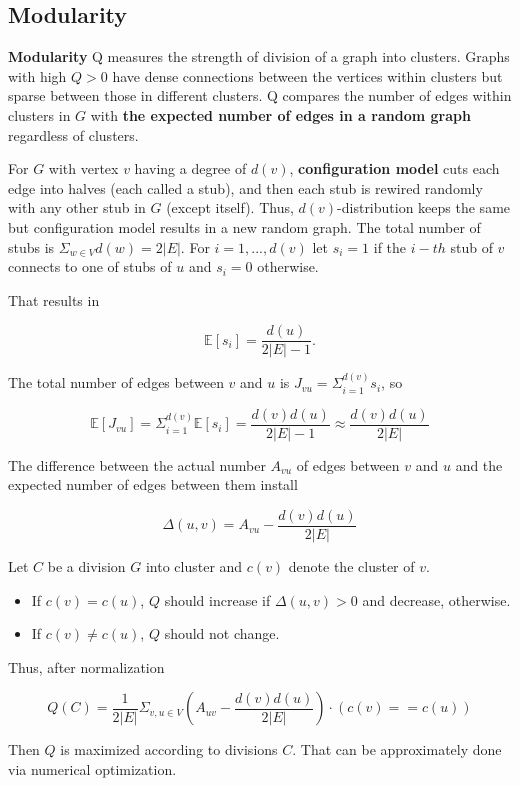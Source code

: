 \subsection*{Modularity}

\textbf{Modularity} Q measures the strength of division of a graph into clusters. Graphs with high $Q > 0$ have dense connections
between the vertices within clusters but sparse between those in different clusters. Q compares the number of edges within clusters in $G$ with \textbf{the expected number of edges in a random graph} regardless of clusters.

For $G$ with vertex $v$ having a degree of $d(v)$, \textbf{configuration model} cuts each edge into halves (each called a stub), and then each stub is rewired randomly with any other stub in $G$ (except itself). Thus, $d(v)$-distribution keeps the same but configuration model results in a new random graph.
The total number of stubs is $\Sigma_{w \in V}d(w) = 2|E|$. For $i = 1, ..., d(v)$ let $s_i = 1$ if the $i-th$ stub of $v$  connects to one of stubs of $u$ and $s_i = 0$ otherwise.

That results in

\begin{equation*}
    \mathbb{E} [s_i] = \frac{d(u)}{2|E| - 1}.
\end{equation*}

The total number of edges between $v$ and $u$ is $J_{vu} = \Sigma_{i=1}^{d(v)}s_i$, so

\begin{equation*}
    \mathbb{E} [J_{vu}] = \Sigma_{i=1}^{d(v)}\mathbb{E}[s_i] = \frac{d(v)d(u)}{2|E| - 1} \approx \frac{d(v)d(u)}{2|E|}
\end{equation*}

The difference between the actual number $A_{vu}$ of edges between $v$ and $u$ and the expected number of edges between them install

\begin{equation*}
    \Delta(u, v) = A_{vu} - \frac{d(v)d(u)}{2|E|}
\end{equation*}

Let $C$ be a division $G$ into cluster and $c(v)$ denote the cluster of $v$.

\begin{itemize}
    \item If $c(v) = c(u)$, $Q$ should increase if $\Delta(u, v) > 0$ and decrease, otherwise.
    \item If $c(v) \neq c(u)$, $Q$ should not change.
\end{itemize}

Thus, after normalization

\begin{equation*}
    Q(C) = \frac{1}{2|E|}\Sigma_{v, u \in V} (A_{uv} - \frac{d(v)d(u)}{2|E|}) \cdot (c(v) == c(u))
\end{equation*}

Then $Q$ is maximized according to divisions $C$. That can be approximately done via numerical optimization.